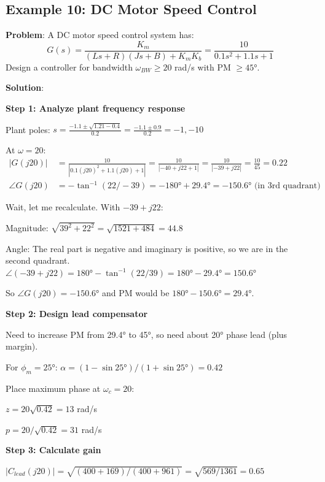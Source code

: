 \subsection{Example 10: DC Motor Speed Control}
\label{subsec:ex_motor_speed}

\textbf{Problem}: A DC motor speed control system has:
\begin{equation}
G(s) = \frac{K_m}{(Ls + R)(Js + B) + K_m K_b} = \frac{10}{0.1s^2 + 1.1s + 1}
\end{equation}
Design a controller for bandwidth $\omega_{BW} \geq 20$ rad/s with PM $\geq 45°$.

\textbf{Solution}:

\textbf{Step 1: Analyze plant frequency response}

Plant poles: $s = \frac{-1.1 \pm \sqrt{1.21 - 0.4}}{0.2} = \frac{-1.1 \pm 0.9}{0.2} = -1, -10$

At $\omega = 20$:
\begin{align}
|G(j20)| &= \frac{10}{|0.1(j20)^2 + 1.1(j20) + 1|} = \frac{10}{|-40 + j22 + 1|} = \frac{10}{|-39 + j22|} = \frac{10}{45} = 0.22 \\
\angle G(j20) &= -\tan^{-1}(22/-39) = -180° + 29.4° = -150.6° \text{ (in 3rd quadrant)}
\end{align}

Wait, let me recalculate. With $-39 + j22$:

Magnitude: $\sqrt{39^2 + 22^2} = \sqrt{1521 + 484} = 44.8$

Angle: The real part is negative and imaginary is positive, so we are in the second quadrant.
$\angle(-39 + j22) = 180° - \tan^{-1}(22/39) = 180° - 29.4° = 150.6°$

So $\angle G(j20) = -150.6°$ and PM would be $180° - 150.6° = 29.4°$.

\textbf{Step 2: Design lead compensator}

Need to increase PM from 29.4° to 45°, so need about 20° phase lead (plus margin).

For $\phi_m = 25°$: $\alpha = (1 - \sin 25°)/(1 + \sin 25°) = 0.42$

Place maximum phase at $\omega_c = 20$:

$z = 20\sqrt{0.42} = 13$ rad/s

$p = 20/\sqrt{0.42} = 31$ rad/s

\textbf{Step 3: Calculate gain}

$|C_{lead}(j20)| = \sqrt{(400+169)/(400+961)} = \sqrt{569/1361} = 0.65$

